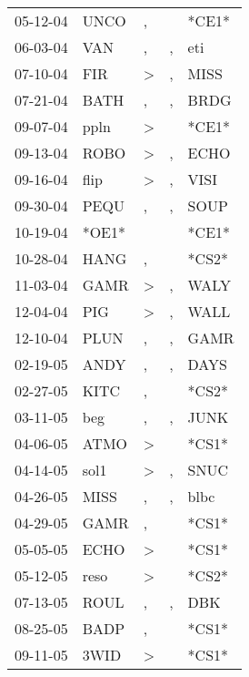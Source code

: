 \begin{supertabular}{lllll}
 05-12-04 &   UNCO &                , &               &  *CE1* \\
 06-03-04 &    VAN &                , &             , &    eti \\
 07-10-04 &    FIR &     \textgreater &             , &   MISS \\
 07-21-04 &   BATH &                , &             , &   BRDG \\
 09-07-04 &   ppln &     \textgreater &               &  *CE1* \\
 09-13-04 &   ROBO &     \textgreater &             , &   ECHO \\
 09-16-04 &   flip &     \textgreater &             , &   VISI \\
 09-30-04 &   PEQU &                , &             , &   SOUP \\
 10-19-04 &  *OE1* &                  &               &  *CE1* \\
 10-28-04 &   HANG &                , &               &  *CS2* \\
 11-03-04 &   GAMR &     \textgreater &             , &   WALY \\
 12-04-04 &    PIG &     \textgreater &             , &   WALL \\
 12-10-04 &   PLUN &                , &             , &   GAMR \\
 02-19-05 &   ANDY &                , &             , &   DAYS \\
 02-27-05 &   KITC &                , &               &  *CS2* \\
 03-11-05 &    beg &                , &             , &   JUNK \\
 04-06-05 &   ATMO &     \textgreater &               &  *CS1* \\
 04-14-05 &   sol1 &     \textgreater &             , &   SNUC \\
 04-26-05 &   MISS &                , &             , &   blbc \\
 04-29-05 &   GAMR &                , &               &  *CS1* \\
 05-05-05 &   ECHO &     \textgreater &               &  *CS1* \\
 05-12-05 &   reso &     \textgreater &               &  *CS2* \\
 07-13-05 &   ROUL &                , &             , &    DBK \\
 08-25-05 &   BADP &                , &               &  *CS1* \\
 09-11-05 &   3WID &     \textgreater &               &  *CS1* \\

\end{supertabular}
